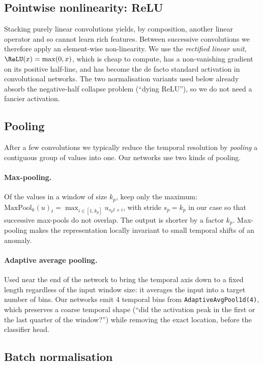 \subsection{Pointwise nonlinearity: ReLU}
\label{sec:relu-theory}

Stacking purely linear convolutions yields, by composition, another
linear operator and so cannot learn rich features. Between successive
convolutions we therefore apply an element-wise non-linearity. We use
the \emph{rectified linear unit}, $\ReLU(x) = \max(0, x)$, which is
cheap to compute, has a non-vanishing gradient on its positive half-line,
and has become the de facto standard activation in convolutional
networks. The two normalisation variants used below already absorb
the negative-half collapse problem (``dying ReLU''), so we do not need a
fancier activation.

\subsection{Pooling}
\label{sec:pool-theory}

After a few convolutions we typically reduce the temporal resolution by
\emph{pooling} a contiguous group of values into one. Our networks use
two kinds of pooling.

\paragraph{Max-pooling.} Of the values in a window of size $k_p$,
keep only the maximum:
$\mathrm{MaxPool}_k(u)_t = \max_{i \in [1, k_p]} u_{s_p t + i}$,
with stride $s_p = k_p$ in our case so that successive max-pools do not
overlap. The output is shorter by a factor $k_p$. Max-pooling makes
the representation locally invariant to small temporal shifts
of an anomaly.

\paragraph{Adaptive average pooling.} Used near the end of the network
to bring the temporal axis down to a fixed length regardless of the
input window size: it averages the input into a target number of bins.
Our networks emit $4$ temporal bins from \texttt{AdaptiveAvgPool1d(4)},
which preserves a coarse temporal shape (``did the activation peak in
the first or the last quarter of the window?'') while removing the
exact location, before the classifier head.

\subsection{Batch normalisation}
\label{sec:bn-theory}

